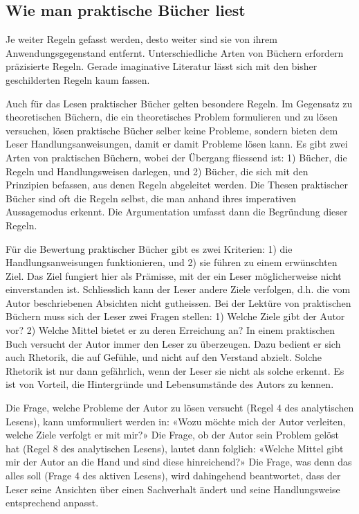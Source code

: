 \documentclass[a4paper,11pt]{scrartcl}
\begin{document}
\subsection{Wie man praktische Bücher liest}

Je weiter Regeln gefasst werden, desto weiter sind sie von ihrem Anwendungsgegenstand entfernt. Unterschiedliche Arten von Büchern erfordern präzisierte Regeln. Gerade imaginative Literatur lässt sich mit den bisher geschilderten Regeln kaum fassen.

Auch für das Lesen praktischer Bücher gelten besondere Regeln. Im Gegensatz zu theoretischen Büchern, die ein theoretisches Problem formulieren und zu lösen versuchen, lösen praktische Bücher selber keine Probleme, sondern bieten dem Leser Handlungsanweisungen, damit er damit Probleme lösen kann. Es gibt zwei Arten von praktischen Büchern, wobei der Übergang fliessend ist: 1) Bücher, die Regeln und Handlungsweisen darlegen, und 2) Bücher, die sich mit den Prinzipien befassen, aus denen Regeln abgeleitet werden. Die Thesen praktischer Bücher sind oft die Regeln selbst, die man anhand ihres imperativen Aussagemodus erkennt. Die Argumentation umfasst dann die Begründung dieser Regeln.

Für die Bewertung praktischer Bücher gibt es zwei Kriterien: 1) die Handlungsanweisungen funktionieren, und 2) sie führen zu einem erwünschten Ziel. Das Ziel fungiert hier als Prämisse, mit der ein Leser möglicherweise nicht einverstanden ist. Schliesslich kann der Leser andere Ziele verfolgen, d.h. die vom Autor beschriebenen Absichten nicht gutheissen. Bei der Lektüre von praktischen Büchern muss sich der Leser zwei Fragen stellen: 1) Welche Ziele gibt der Autor vor? 2) Welche Mittel bietet er zu deren Erreichung an? In einem praktischen Buch versucht der Autor immer den Leser zu überzeugen. Dazu bedient er sich auch Rhetorik, die auf Gefühle, und nicht auf den Verstand abzielt. Solche Rhetorik ist nur dann gefährlich, wenn der Leser sie nicht als solche erkennt. Es ist von Vorteil, die Hintergründe und Lebensumstände des Autors zu kennen.

Die Frage, welche Probleme der Autor zu lösen versucht (Regel 4 des analytischen Lesens), kann umformuliert werden in: «Wozu möchte mich der Autor verleiten, welche Ziele verfolgt er mit mir?» Die Frage, ob der Autor sein Problem gelöst hat (Regel 8 des analytischen Lesens), lautet dann folglich: «Welche Mittel gibt mir der Autor an die Hand und sind diese hinreichend?» Die Frage, was denn das alles soll (Frage 4 des aktiven Lesens), wird dahingehend beantwortet, dass der Leser seine Ansichten über einen Sachverhalt ändert und seine Handlungsweise entsprechend anpasst.
\end{document}
